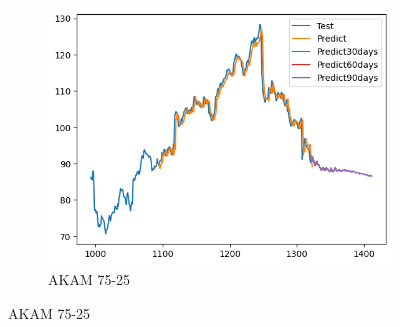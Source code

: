 \documentclass{ieeeojies}
\begin{document}
\begin{figure}[H]
\begin{subfigure}[h]{0.33\linewidth}
        \centering
        \includegraphics[width=\linewidth]{RNN Plot/RNN_AKAM_75_25.png}
        \caption{AKAM 75-25}
        \label{fig:akam-75-25}
    \end{subfigure}
    \vspace{10pt}
\end{figure}
 \vspace{-20pt}
\end{document}
